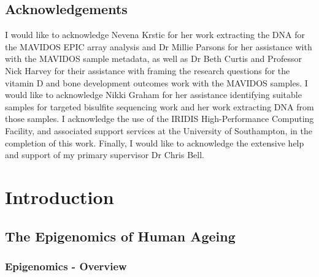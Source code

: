 \documentclass[]{book}
\begin{document}
\hypertarget{acknowledgements}{%
\chapter*{Acknowledgements}\label{acknowledgements}}

I would like to acknowledge Nevena Krstic for her work extracting the DNA for the MAVIDOS EPIC array analysis and Dr Millie Parsons for her assistance with with the MAVIDOS sample metadata, as well as Dr Beth Curtis and Professor Nick Harvey for their assistance with framing the research questions for the vitamin D and bone development outcomes work with the MAVIDOS samples. I would like to acknowledge Nikki Graham for her assistance identifying suitable samples for targeted bisulfite sequencing work and her work extracting DNA from those samples. I acknowledge the use of the IRIDIS High-Performance Computing Facility, and associated support services at the University of Southampton, in the completion of this work. Finally, I would like to acknowledge the extensive help and support of my primary supervisor Dr Chris Bell.

\hypertarget{part-introduction}{%
\part{Introduction}\label{part-introduction}}

\hypertarget{intro}{%
\chapter{The Epigenomics of Human Ageing}\label{intro}}

\hypertarget{epigenomics---overview}{%
\section{Epigenomics - Overview}\label{epigenomics---overview}}
\end{document}
